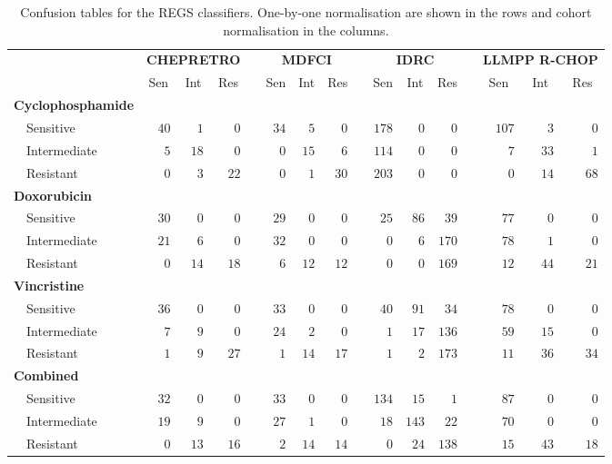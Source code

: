 \begin{table}[!tbp]
{\small
\caption{Confusion tables for the REGS classifiers.
One-by-one normalisation are shown in the rows and cohort normalisation in the
columns.\label{tab:confusiondrugonebyone}} 
\begin{center}
\begin{tabular}{lrrrcrrrcrrrcrrr}
\hline\hline
\multicolumn{1}{l}{\bfseries }&\multicolumn{3}{c}{\bfseries CHEPRETRO}&\multicolumn{1}{c}{\bfseries }&\multicolumn{3}{c}{\bfseries MDFCI}&\multicolumn{1}{c}{\bfseries }&\multicolumn{3}{c}{\bfseries IDRC}&\multicolumn{1}{c}{\bfseries }&\multicolumn{3}{c}{\bfseries LLMPP R-CHOP}\tabularnewline
\cline{2-4} \cline{6-8} \cline{10-12} \cline{14-16}
\multicolumn{1}{l}{}&\multicolumn{1}{c}{Sen}&\multicolumn{1}{c}{Int}&\multicolumn{1}{c}{Res}&\multicolumn{1}{c}{}&\multicolumn{1}{c}{Sen}&\multicolumn{1}{c}{Int}&\multicolumn{1}{c}{Res}&\multicolumn{1}{c}{}&\multicolumn{1}{c}{Sen}&\multicolumn{1}{c}{Int}&\multicolumn{1}{c}{Res}&\multicolumn{1}{c}{}&\multicolumn{1}{c}{Sen}&\multicolumn{1}{c}{Int}&\multicolumn{1}{c}{Res}\tabularnewline
\hline
{\bfseries Cyclophosphamide}&&&&&&&&&&&&&&&\tabularnewline
~~Sensitive&$40$&$ 1$&$ 0$&&$34$&$ 5$&$ 0$&&$178$&$  0$&$  0$&&$107$&$ 3$&$ 0$\tabularnewline
~~Intermediate&$ 5$&$18$&$ 0$&&$ 0$&$15$&$ 6$&&$114$&$  0$&$  0$&&$  7$&$33$&$ 1$\tabularnewline
~~Resistant&$ 0$&$ 3$&$22$&&$ 0$&$ 1$&$30$&&$203$&$  0$&$  0$&&$  0$&$14$&$68$\tabularnewline
\hline
{\bfseries Doxorubicin}&&&&&&&&&&&&&&&\tabularnewline
~~Sensitive&$30$&$ 0$&$ 0$&&$29$&$ 0$&$ 0$&&$ 25$&$ 86$&$ 39$&&$ 77$&$ 0$&$ 0$\tabularnewline
~~Intermediate&$21$&$ 6$&$ 0$&&$32$&$ 0$&$ 0$&&$  0$&$  6$&$170$&&$ 78$&$ 1$&$ 0$\tabularnewline
~~Resistant&$ 0$&$14$&$18$&&$ 6$&$12$&$12$&&$  0$&$  0$&$169$&&$ 12$&$44$&$21$\tabularnewline
\hline
{\bfseries Vincristine}&&&&&&&&&&&&&&&\tabularnewline
~~Sensitive&$36$&$ 0$&$ 0$&&$33$&$ 0$&$ 0$&&$ 40$&$ 91$&$ 34$&&$ 78$&$ 0$&$ 0$\tabularnewline
~~Intermediate&$ 7$&$ 9$&$ 0$&&$24$&$ 2$&$ 0$&&$  1$&$ 17$&$136$&&$ 59$&$15$&$ 0$\tabularnewline
~~Resistant&$ 1$&$ 9$&$27$&&$ 1$&$14$&$17$&&$  1$&$  2$&$173$&&$ 11$&$36$&$34$\tabularnewline
\hline
{\bfseries Combined}&&&&&&&&&&&&&&&\tabularnewline
~~Sensitive&$32$&$ 0$&$ 0$&&$33$&$ 0$&$ 0$&&$134$&$ 15$&$  1$&&$ 87$&$ 0$&$ 0$\tabularnewline
~~Intermediate&$19$&$ 9$&$ 0$&&$27$&$ 1$&$ 0$&&$ 18$&$143$&$ 22$&&$ 70$&$ 0$&$ 0$\tabularnewline
~~Resistant&$ 0$&$13$&$16$&&$ 2$&$14$&$14$&&$  0$&$ 24$&$138$&&$ 15$&$43$&$18$\tabularnewline
\hline
\end{tabular}\end{center}}

\end{table}
